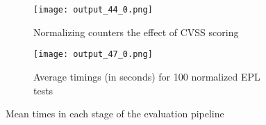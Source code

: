 \begin{figure}
    \centering
    \begin{subfigure}[t]{0.3\textwidth}
        \texttt{[image: output\_44\_0.png]} 
        \caption{Normalizing counters the effect of CVSS scoring} 
        \label{fig:norm_epl}
    \end{subfigure}
          \begin{subfigure}[t]{0.3\textwidth}
        \centering
        \texttt{[image: output\_47\_0.png]}
        \caption{Average timings (in seconds) for 100 normalized EPL tests }
        \label{fig:norm_timings}
    \end{subfigure}
        \hfill
    \caption{Mean times in each stage of the evaluation pipeline}\label{fig:timings}
\end{figure}

    
    
    
     
    
    
    
    
    
    
    
        

